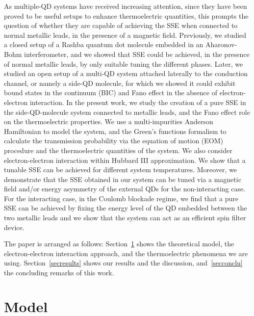 \documentclass[aps,twocolumn,prb,superscript,floatfix,superscriptaddress,showpacs]{revtex4-1}
\begin{document}
As multiple-QD systems have received increasing attention, since they have been proved to be useful setups to enhance thermoelectric quantities, \cite{Urban2015,Lambert2015,Li2016} this prompts the question of whether they are capable of achieving the SSE when connected to normal metallic leads, in the presence of a magnetic field. Previously, we studied a closed setup of a Rashba quantum dot molecule embedded in an Aharonov-Bohm interferometer, and we showed that SSE could be achieved, in the presence of normal metallic leads, by only suitable tuning the different phases.\cite{gomez2014} Later, we studied an open setup of a multi-QD system attached laterally to the conduction channel, or namely a side-QD molecule, for which we showed it could exhibit bound states in the continuum (BIC) and Fano effect in the absence of electron-electron interaction.\cite{ramos2014} In the present work, we study the creation of a pure SSE in the side-QD-molecule system connected to metallic leads, and the Fano effect role on the thermoelectric properties. We use a multi-impurities Anderson Hamiltonian to model the system, and the Green's functions formalism to calculate the transmission probability via the equation of motion (EOM) procedure and the thermoelectric quantities of the system. We also consider electron-electron interaction within Hubbard III approximation. We show that a tunable SSE can be achieved for different system temperatures. Moreover, we demonstrate that the SSE obtained in our system can be tuned via a  magnetic field and/or energy asymmetry of the external QDs for the non-interacting case. For the interacting case, in the Coulomb blockade regime, we find that a pure SSE can be achieved by fixing the energy level of the QD embedded between the two metallic leads and we show that the system can act as an efficient spin filter device.

The paper is arranged as follows: Section\ \ref{secmodel} shows the theoretical model, the electron-electron interaction approach, and the thermoelectric phenomena we are using. Section\ \ref{secresults} shows our results and the discussion, and\ \ref{secconclu} the concluding remarks of this work.

\section{Model}\label{secmodel}
\end{document}
